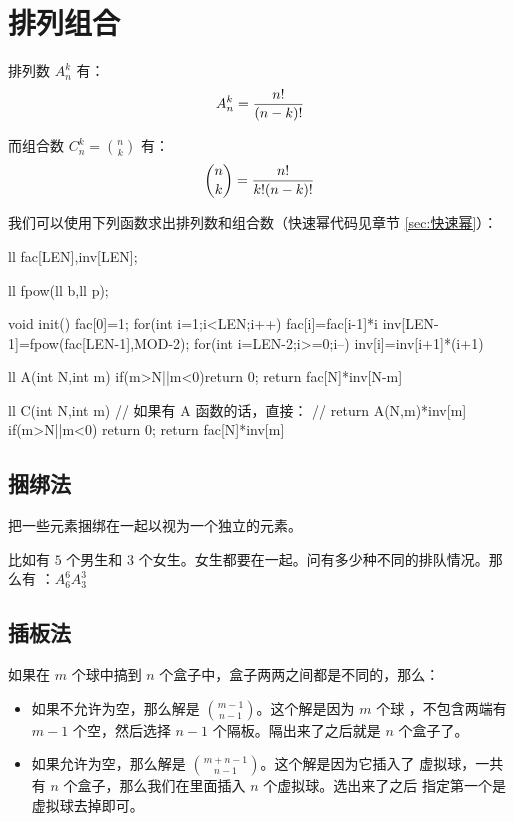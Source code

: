 \section{排列组合}
排列数 $A_n^k$ 有：\[
    A_n^k = {n! \over (n-k)!}
\]

而组合数 $C_n^k = {n \choose k}$ 有：\[
    {n \choose k} = {n! \over k! (n-k)!}
\]

我们可以使用下列函数求出排列数和组合数（快速幂代码见章节 \ref{sec:快速幂}）：
\begin{Cpp}
ll fac[LEN],inv[LEN];

ll fpow(ll b,ll p);

void init(){
  fac[0]=1;
  for(int i=1;i<LEN;i++)
    fac[i]=fac[i-1]*i%
  inv[LEN-1]=fpow(fac[LEN-1],MOD-2);
  for(int i=LEN-2;i>=0;i--)
    inv[i]=inv[i+1]*(i+1)%
}

ll A(int N,int m){
  if(m>N||m<0)return 0;
  return fac[N]*inv[N-m]%
}

ll C(int N,int m){
  // 如果有 A 函数的话，直接：
  // return A(N,m)*inv[m]%
  if(m>N||m<0) return 0;
  return fac[N]*inv[m]%
}
\end{Cpp}



\subsection{捆绑法}

把一些元素捆绑在一起以视为一个独立的元素。

比如有 $5$ 个男生和 $3$ 个女生。女生都要在一起。问有多少种不同的排队情况。那么有
：$A_6^6 A_3^3$



\subsection{插板法}
\label{subsec:插板法} \label{subsec:插空法}

如果在 $m$ 个球中搞到 $n$ 个盒子中，盒子两两之间都是不同的，那么：
\begin{itemize}
    \item 如果不允许为空，那么解是 $m - 1 \choose n - 1$。这个解是因为 $m$ 个球
        ，不包含两端有 $m - 1$ 个空，然后选择 $n - 1$ 个隔板。隔出来了之后就是
        $n$ 个盒子了。
    \item 如果允许为空，那么解是 $m + n - 1 \choose n - 1$。这个解是因为它插入了
        虚拟球，一共有 $n$ 个盒子，那么我们在里面插入 $n$ 个虚拟球。选出来了之后
        指定第一个是虚拟球去掉即可。
\end{itemize}



